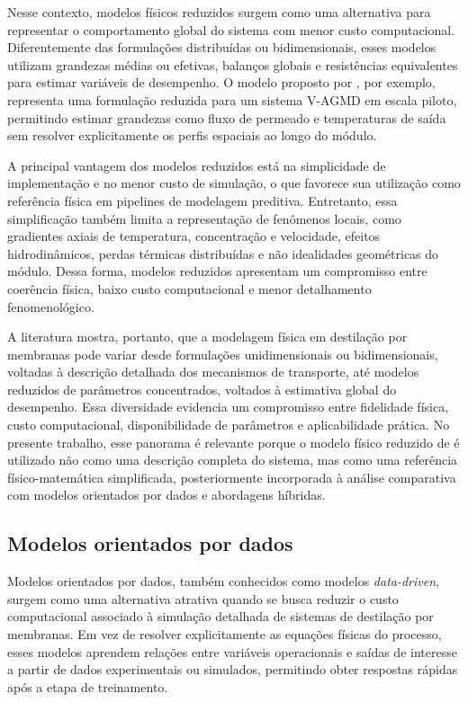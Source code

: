 Nesse contexto, modelos físicos reduzidos surgem como uma alternativa para representar o comportamento global do sistema com menor custo computacional. Diferentemente das formulações distribuídas ou bidimensionais, esses modelos utilizam grandezas médias ou efetivas, balanços globais e resistências equivalentes para estimar variáveis de desempenho. O modelo proposto por \cite{Lisboa2024}, por exemplo, representa uma formulação reduzida para um sistema V-AGMD em escala piloto, permitindo estimar grandezas como fluxo de permeado e temperaturas de saída sem resolver explicitamente os perfis espaciais ao longo do módulo.

A principal vantagem dos modelos reduzidos está na simplicidade de implementação e no menor custo de simulação, o que favorece sua utilização como referência física em pipelines de modelagem preditiva. Entretanto, essa simplificação também limita a representação de fenômenos locais, como gradientes axiais de temperatura, concentração e velocidade, efeitos hidrodinâmicos, perdas térmicas distribuídas e não idealidades geométricas do módulo. Dessa forma, modelos reduzidos apresentam um compromisso entre coerência física, baixo custo computacional e menor detalhamento fenomenológico.

A literatura mostra, portanto, que a modelagem física em destilação por membranas pode variar desde formulações unidimensionais ou bidimensionais, voltadas à descrição detalhada dos mecanismos de transporte, até modelos reduzidos de parâmetros concentrados, voltados à estimativa global do desempenho. Essa diversidade evidencia um compromisso entre fidelidade física, custo computacional, disponibilidade de parâmetros e aplicabilidade prática. No presente trabalho, esse panorama é relevante porque o modelo físico reduzido de \cite{Lisboa2024} é utilizado não como uma descrição completa do sistema, mas como uma referência físico-matemática simplificada, posteriormente incorporada à análise comparativa com modelos orientados por dados e abordagens híbridas.
\subsection{Modelos orientados por dados}

Modelos orientados por dados, também conhecidos como modelos \textit{data-driven}, surgem como uma alternativa atrativa quando se busca reduzir o custo computacional associado à simulação detalhada de sistemas de destilação por membranas. Em vez de resolver explicitamente as equações físicas do processo, esses modelos aprendem relações entre variáveis operacionais e saídas de interesse a partir de dados experimentais ou simulados, permitindo obter respostas rápidas após a etapa de treinamento.


